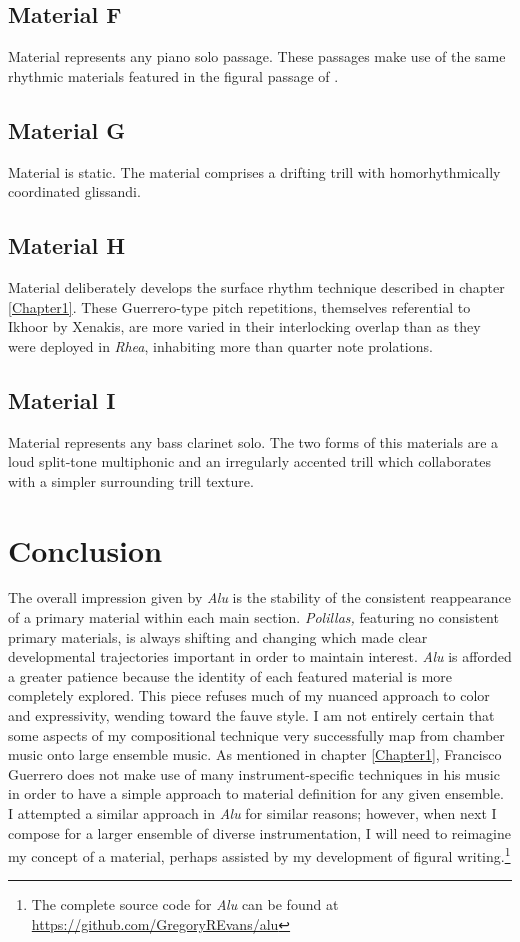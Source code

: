 \subsection{Material F}

Material  represents any piano solo passage. These passages make use of the same rhythmic materials featured in the figural passage of .

\subsection{Material G}

Material  is static. The material comprises a drifting trill with homorhythmically coordinated glissandi.

\subsection{Material H}

Material  deliberately develops the surface rhythm technique described in chapter \vref{Chapter1}. These Guerrero-type pitch repetitions, themselves referential to Ikhoor by Xenakis, are more varied in their interlocking overlap than as they were deployed in \textit{Rhea}, inhabiting more than quarter note prolations.

\subsection{Material I}

Material  represents any bass clarinet solo. The two forms of this materials are a loud split-tone multiphonic and an irregularly accented trill which collaborates with a simpler surrounding trill texture.

\section{Conclusion}

The overall impression given by \textit{Alu} is the stability of the consistent reappearance of a primary material within each main section. \textit{Polillas,} featuring no consistent primary materials, is always shifting and changing which made clear developmental trajectories important in order to maintain interest. \textit{Alu} is afforded a greater patience because the identity of each featured material is more completely explored. This piece refuses much of my nuanced approach to color and expressivity, wending toward the fauve style. I am not entirely certain that some aspects of my compositional technique very successfully map from chamber music onto large ensemble music. As mentioned in chapter \ref{Chapter1}, Francisco Guerrero does not make use of many instrument-specific techniques in his music in order to have a simple approach to material definition for any given ensemble. I attempted a similar approach in 
\textit{Alu} for similar reasons; however, when next I compose for a larger ensemble of diverse instrumentation, I will need to reimagine my concept of a material, perhaps assisted by my development of figural writing.\footnote{The complete source code for \textit{Alu} can be found at \url{https://github.com/GregoryREvans/alu}} 